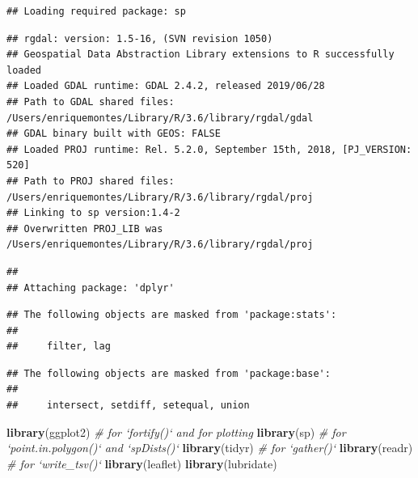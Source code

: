 \documentclass[12pt,]{article}
\newenvironment{Shaded}{\begin{snugshade}}{\end{snugshade}}
\newcommand{\CommentTok}[1]{\textcolor[rgb]{0.56,0.35,0.01}{\textit{#1}}}
\newcommand{\KeywordTok}[1]{\textcolor[rgb]{0.13,0.29,0.53}{\textbf{#1}}}
\newcommand{\NormalTok}[1]{#1}
\begin{document}
\begin{verbatim}
## Loading required package: sp
\end{verbatim}

\begin{verbatim}
## rgdal: version: 1.5-16, (SVN revision 1050)
## Geospatial Data Abstraction Library extensions to R successfully loaded
## Loaded GDAL runtime: GDAL 2.4.2, released 2019/06/28
## Path to GDAL shared files: /Users/enriquemontes/Library/R/3.6/library/rgdal/gdal
## GDAL binary built with GEOS: FALSE 
## Loaded PROJ runtime: Rel. 5.2.0, September 15th, 2018, [PJ_VERSION: 520]
## Path to PROJ shared files: /Users/enriquemontes/Library/R/3.6/library/rgdal/proj
## Linking to sp version:1.4-2
## Overwritten PROJ_LIB was /Users/enriquemontes/Library/R/3.6/library/rgdal/proj
\end{verbatim}

\begin{Shaded}
\end{Shaded}

\begin{verbatim}
## 
## Attaching package: 'dplyr'
\end{verbatim}

\begin{verbatim}
## The following objects are masked from 'package:stats':
## 
##     filter, lag
\end{verbatim}

\begin{verbatim}
## The following objects are masked from 'package:base':
## 
##     intersect, setdiff, setequal, union
\end{verbatim}

\begin{Shaded}
\begin{Highlighting}[]
\KeywordTok{library}\NormalTok{(ggplot2) }\CommentTok{# for `fortify()` and for plotting}
\KeywordTok{library}\NormalTok{(sp) }\CommentTok{# for `point.in.polygon()` and `spDists()`}
\KeywordTok{library}\NormalTok{(tidyr) }\CommentTok{# for `gather()`}
\KeywordTok{library}\NormalTok{(readr) }\CommentTok{# for `write_tsv()`}
\KeywordTok{library}\NormalTok{(leaflet)}
\KeywordTok{library}\NormalTok{(lubridate)}
\end{Highlighting}
\end{Shaded}
\end{document}
